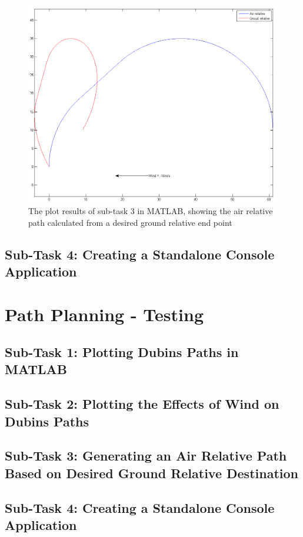 \begin{figure}[htbp!] 
\centering    
\includegraphics[width=\textwidth]{PP3_Demo}
\caption[Task 3: Generating an Air Relative Path Based on Desired Ground Relative Destination in MATLAB]{The plot results of sub-task 3 in MATLAB, showing the air relative path calculated from a desired ground relative end point}
\label{fig:pp3demo}
\end{figure}


\subsection{Sub-Task 4: Creating a Standalone Console Application}
\label{task1:implementation:subtask4}

\section{Path Planning - Testing}
\label{task1:testing}

\subsection{Sub-Task 1: Plotting Dubins Paths in MATLAB}
\label{task1:testing:subtask1}


\subsection{Sub-Task 2: Plotting the Effects of Wind on Dubins Paths}
\label{task1:testing:subtask2}


\subsection{Sub-Task 3: Generating an Air Relative Path Based on Desired Ground Relative Destination}
\label{task1:testing:subtask3}


\subsection{Sub-Task 4: Creating a Standalone Console Application}
\label{task1:testing:subtask4}
